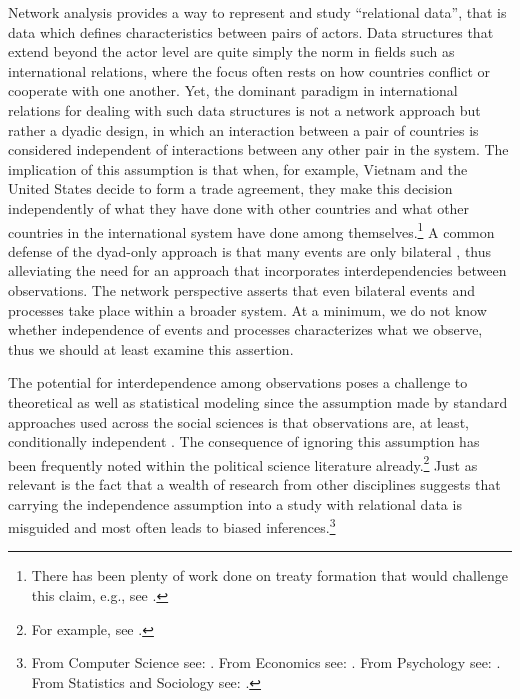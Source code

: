 \documentclass[11pt,pdflatex]{elsarticle}
\begin{document}
Network analysis provides a way to represent and study ``relational data'', that is data which defines characteristics between pairs of actors. Data structures that extend beyond the actor level are quite simply the norm in fields such as international relations, where the focus often rests on how countries conflict or cooperate with one another. Yet, the dominant paradigm in international relations for dealing with such data structures is not a network approach but rather a dyadic design, in which an interaction between a pair of countries is considered independent of interactions between any other pair in the system. The implication of this assumption is that when, for example, Vietnam and the United States decide to form a trade agreement, they make this decision independently of what they have done with other countries and what other countries in the international system have done among themselves.\footnote{There has been plenty of work done on treaty formation that would challenge this claim, e.g., see \citet{manger:etal:2012}.} A common defense of the dyad-only approach is that many events are only bilateral \citep{diehl:wright:2016}, thus alleviating the need for an approach that incorporates interdependencies between observations. The network perspective asserts that even bilateral events and processes take place within a broader system. At a minimum, we do not know whether independence of events and processes characterizes what we observe, thus we should at least examine this assertion.  

The potential for interdependence among observations poses a challenge to theoretical as well as statistical modeling since the assumption made by standard approaches used across the social sciences is that observations are, at least, conditionally independent \citep{snijders:2011}. The consequence of ignoring this assumption has been frequently noted within the political science literature already.\footnote{For example, see \citet{beck:etal:1998,signorino:1999,aronow:etal:2015}.}  Just as relevant is the fact that a wealth of research from other disciplines suggests that carrying the independence assumption into a study with relational data is misguided and most often leads to biased inferences.\footnote{From Computer Science see: \citet{bonabeau:2002,brandes:erlebach:2005}. From Economics see: \citet{goyal:2012,jackson:2014}. From Psychology see: \citet{pattison:wasserman:1999,kenny:etal:2006}. From Statistics and Sociology see: \citet{snijders:1996,hoff:etal:2002}.} 
\end{document}
